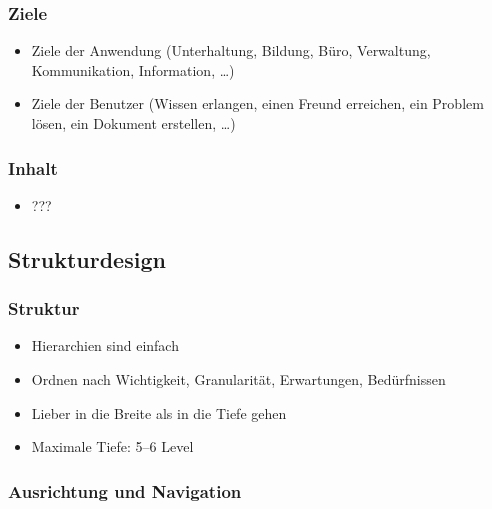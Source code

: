 \subsubsection{Ziele}

\begin{itemize}
\item
  Ziele der Anwendung (Unterhaltung, Bildung, Büro, Verwaltung,
  Kommunikation, Information, \ldots{})
\item
  Ziele der Benutzer (Wissen erlangen, einen Freund erreichen, ein
  Problem lösen, ein Dokument erstellen, \ldots{})
\end{itemize}

\subsubsection{Inhalt}

\begin{itemize}
\item
  ???
\end{itemize}

\subsection{Strukturdesign}

\subsubsection{Struktur}

\begin{itemize}
\item
  Hierarchien sind einfach
\item
  Ordnen nach Wichtigkeit, Granularität, Erwartungen, Bedürfnissen
\item
  Lieber in die Breite als in die Tiefe gehen
\item
  Maximale Tiefe: 5--6 Level
\end{itemize}

\subsubsection{Ausrichtung und Navigation}

